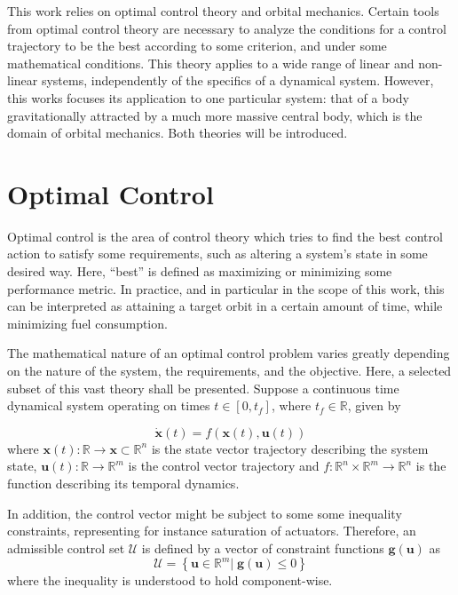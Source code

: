 
This work relies on optimal control theory and orbital mechanics. Certain tools from optimal control theory are necessary to analyze the conditions for a control trajectory to be the best according to some criterion, and under some mathematical conditions. This theory applies to a wide range of linear and non-linear systems, independently of the specifics of a dynamical system. However, this works focuses its application to one particular system: that of a body gravitationally attracted by a much more massive central body, which is the domain of orbital mechanics. Both theories will be introduced.

\section{Optimal Control}

Optimal control is the area of control theory which tries to find the best control action to satisfy some requirements, such as altering a system's state in some desired way. Here, ``best''  is defined as maximizing or minimizing some performance metric. In practice, and in particular in the scope of this work, this can be interpreted as attaining a target orbit in a certain amount of time, while minimizing fuel consumption.

The mathematical nature of an optimal control problem varies greatly depending on the nature of the system, the requirements, and the objective. Here, a selected subset of this vast theory shall be presented. Suppose a continuous time dynamical system operating on times \(t \in [0, t_f]\), where \(t_f \in \mathbb{R}\), given by

\begin{equation} \label{eq:generic_dyn}
    \dot{\mathbf{x}}(t) = f(\mathbf{x}(t), \mathbf{u}(t))
\end{equation}
where \(\mathbf{x}(t): \mathbb{R} \rightarrow \mathcal{\mathbf{x}} \subset \mathbb{R}^n\) is the state vector trajectory describing the system state, \(\mathbf{u}(t): \mathbb{R} \rightarrow \mathbb{R}^m\) is the control vector trajectory and \(f: \mathbb{R}^n \times \mathbb{R}^m \rightarrow \mathbb{R}^n\) is the function describing its temporal dynamics. 

In addition, the control vector might be subject to some some inequality constraints, representing for instance saturation of actuators. Therefore, an admissible control set \(\mathcal{U}\) is defined by a vector of constraint functions \(\mathbf{g}(\mathbf{u})\) as
\begin{equation}
    \mathcal{U} = \left\{\mathbf{u} \in \mathbb{R}^m |\; \mathbf{g}(\mathbf{u}) \leq 0\right\}
\end{equation}
where the inequality is understood to hold component-wise.

